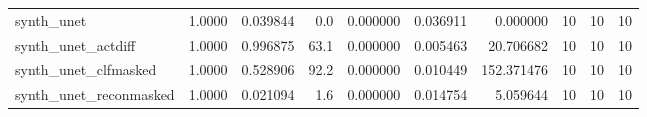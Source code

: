 \begin{tabular}{lrrrrrrrrr}
synth\_unet             &     1.0000 &   0.039844 &         0.0 &       0.000000 &       0.036911 &        0.000000 &               10 &               10 &                10 \\
synth\_unet\_actdiff     &     1.0000 &   0.996875 &        63.1 &       0.000000 &       0.005463 &       20.706682 &               10 &               10 &                10 \\
synth\_unet\_clfmasked   &     1.0000 &   0.528906 &        92.2 &       0.000000 &       0.010449 &      152.371476 &               10 &               10 &                10 \\
synth\_unet\_reconmasked &     1.0000 &   0.021094 &         1.6 &       0.000000 &       0.014754 &        5.059644 &               10 &               10 &                10 \\
\bottomrule
\end{tabular}

